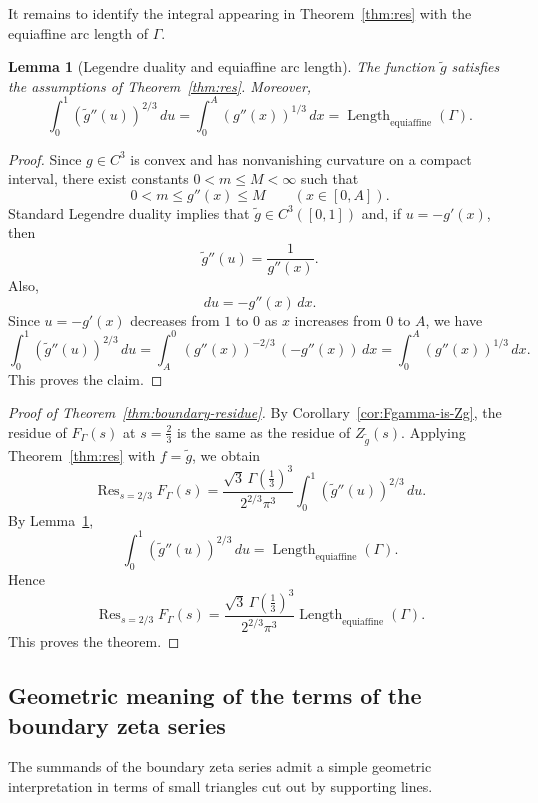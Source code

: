 \documentclass[a4paper,american,11pt]{amsart}
\theoremstyle{plain}
\newtheorem{lemma}[theorem]{Lemma}
\theoremstyle{definition}
\DeclareMathOperator*{\Res}{Res}
\DeclareMathOperator{\Length}{Length}
\begin{document}
It remains to identify the integral appearing in Theorem~\ref{thm:res} with
the equiaffine arc length of \(\Gamma\).

\begin{lemma}[Legendre duality and equiaffine arc length]
\label{lem:Legendre-ea}
The function \(\widetilde g\) satisfies the assumptions of
Theorem~\ref{thm:res}. Moreover,
\[
\int_0^1 (\widetilde g''(u))^{2/3}\,du
=
\int_0^A (g''(x))^{1/3}\,dx
=
\Length_{\mathrm{equiaffine}}(\Gamma).
\]
\end{lemma}

\begin{proof}
Since \(g\in C^3\) is convex and has nonvanishing curvature on a compact
interval, there exist constants \(0<m\le M<\infty\) such that
\[
0<m\le g''(x)\le M
\qquad
(x\in[0,A]).
\]
Standard Legendre duality implies that \(\widetilde g\in C^3([0,1])\) and,
if \(u=-g'(x)\), then
\[
\widetilde g''(u)=\frac{1}{g''(x)}.
\]
Also,
\[
du=-g''(x)\,dx.
\]
Since \(u=-g'(x)\) decreases from \(1\) to \(0\) as \(x\) increases from
\(0\) to \(A\), we have
\[
\int_0^1 (\widetilde g''(u))^{2/3}\,du
=
\int_A^0 (g''(x))^{-2/3}\,(-g''(x))\,dx
=
\int_0^A (g''(x))^{1/3}\,dx.
\]
This proves the claim.
\end{proof}

\begin{proof}[Proof of Theorem~\ref{thm:boundary-residue}]
\label{proof:thm:boundary-residue}
By Corollary~\ref{cor:Fgamma-is-Zg}, the residue of \(F_\Gamma(s)\) at
\(s=\frac23\) is the same as the residue of \(Z_{\widetilde g}(s)\). Applying
Theorem~\ref{thm:res} with \(f=\widetilde g\), we obtain
\[
\Res_{s=2/3}F_\Gamma(s)
=
\frac{\sqrt3\,\Gamma\!\left(\frac13\right)^3}{2^{2/3}\pi^3}
\int_0^1 (\widetilde g''(u))^{2/3}\,du.
\]
By Lemma~\ref{lem:Legendre-ea},
\[
\int_0^1 (\widetilde g''(u))^{2/3}\,du
=
\Length_{\mathrm{equiaffine}}(\Gamma).
\]
Hence
\[
\Res_{s=2/3}F_\Gamma(s)
=
\frac{\sqrt3\,\Gamma\!\left(\frac13\right)^3}{2^{2/3}\pi^3}
\Length_{\mathrm{equiaffine}}(\Gamma).
\]
This proves the theorem.
\end{proof}

\subsection{Geometric meaning of the terms of the boundary zeta series}
\label{sseq:geommeaning}

The summands of the boundary zeta series admit a simple geometric
interpretation in terms of small triangles cut out by supporting lines.
\end{document}
